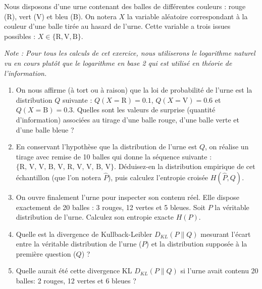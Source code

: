 \documentclass[solutions]{../exercices}
\begin{document}
	
		
	\begin{exercice}
		Nous disposons d'une urne contenant des balles de différentes couleurs : rouge (R), vert (V) et bleu (B). On notera $X$ la variable aléatoire correspondant à la couleur d'une balle tirée au hasard de l'urne. Cette variable a trois issues possibles : $X \in \{\text{R}, \text{V}, \text{B}\}$. 
		
		\textit{Note : Pour tous les calculs de cet exercice, nous utiliserons le logarithme naturel vu en cours plutôt que le logarithme en base 2 qui est utilisé en théorie de l'information.}
		
		\begin{enumerate}
			\item On nous affirme (à tort ou à raison) que la loi de probabilité de l'urne est la distribution $Q$ suivante : $Q(X=\text{R}) = 0.1$, $Q(X=\text{V}) = 0.6$ et $Q(X=\text{B}) = 0.3$. 
			Quelles sont les valeurs de surprise (quantité d'information) associées au tirage d'une balle rouge, d'une balle verte et d'une balle bleue ?
			
			\item En conservant l'hypothèse que la distribution de l'urne est $Q$, on réalise un tirage avec remise de 10 balles qui donne la séquence suivante : $\{\text{R, V, V, B, V, R, V, V, B, V}\}$. 
			Déduisez-en la distribution empirique de cet échantillon (que l'on notera $\hat{P}$), puis calculez l'entropie croisée $H(\hat{P}, Q)$.
			
			\item On ouvre finalement l'urne pour inspecter son contenu réel. Elle dispose exactement de 20 balles : 3 rouges, 12 vertes et 5 bleues. 
			Soit $P$ la véritable distribution de l'urne. Calculez son entropie exacte $H(P)$.
			
			\item Quelle est la divergence de Kullback-Leibler $D_{KL}(P \parallel Q)$ mesurant l'écart entre la véritable distribution de l'urne ($P$) et la distribution supposée à la première question ($Q$) ? 
			
			\item Quelle aurait été cette divergence KL $D_{KL}(P \parallel Q)$ si l'urne avait contenu 20 balles: 2 rouges, 12 vertes et 6 bleues ?
		\end{enumerate}
	\end{exercice}
	
\end{document}

